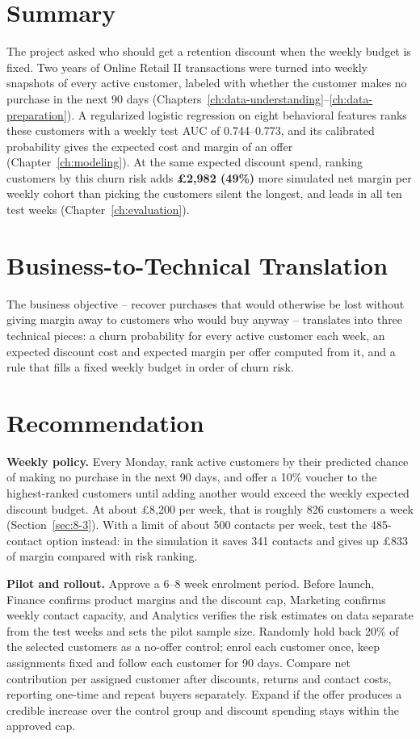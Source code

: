 \section{Summary}
\label{sec:10-1}

The project asked who should get a retention discount when the weekly budget is fixed. Two years of Online Retail II transactions were turned into weekly snapshots of every active customer, labeled with whether the customer makes no purchase in the next 90 days (Chapters~\ref{ch:data-understanding}--\ref{ch:data-preparation}). A regularized logistic regression on eight behavioral features ranks these customers with a weekly test AUC of 0.744--0.773, and its calibrated probability gives the expected cost and margin of an offer (Chapter~\ref{ch:modeling}). At the same expected discount spend, ranking customers by this churn risk adds \textbf{\pounds2,982 (49\%)} more simulated net margin per weekly cohort than picking the customers silent the longest, and leads in all ten test weeks (Chapter~\ref{ch:evaluation}).

\section{Business-to-Technical Translation}
\label{sec:10-2}

The business objective -- recover purchases that would otherwise be lost without giving margin away to customers who would buy anyway -- translates into three technical pieces: a churn probability for every active customer each week, an expected discount cost and expected margin per offer computed from it, and a rule that fills a fixed weekly budget in order of churn risk.

\section{Recommendation}
\label{sec:10-3}

\textbf{Weekly policy.} Every Monday, rank active customers by their predicted chance of making no purchase in the next 90 days, and offer a 10\% voucher to the highest-ranked customers until adding another would exceed the weekly expected discount budget. At about \pounds8,200 per week, that is roughly 826 customers a week (Section~\ref{sec:8-3}). With a limit of about 500 contacts per week, test the 485-contact option instead: in the simulation it saves 341 contacts and gives up \pounds833 of margin compared with risk ranking.

\textbf{Pilot and rollout.} Approve a 6--8 week enrolment period. Before launch, Finance confirms product margins and the discount cap, Marketing confirms weekly contact capacity, and Analytics verifies the risk estimates on data separate from the test weeks and sets the pilot sample size. Randomly hold back 20\% of the selected customers as a no-offer control; enrol each customer once, keep assignments fixed and follow each customer for 90 days. Compare net contribution per assigned customer after discounts, returns and contact costs, reporting one-time and repeat buyers separately. Expand if the offer produces a credible increase over the control group and discount spending stays within the approved cap.

